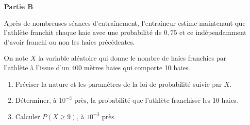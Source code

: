 \smallskip

\textbf{Partie B}

\medskip

Après de nombreuses séances d'entraînement, l’entraineur estime maintenant que l’athlète franchit chaque haie avec une probabilité de $0,75$ et ce indépendamment d’avoir franchi ou non les haies précédentes.

\smallskip

On note $X$ la variable aléatoire qui donne le nombre de haies franchies par l’athlète à l’issue d’un 400 mètres haies qui comporte 10 haies.

\begin{enumerate}
	\item Préciser la nature et les paramètres de la loi de probabilité suivie par $X$.
	\item Déterminer, à $10^{-3}$ près, la probabilité que l’athlète franchisse les 10 haies.
	\item Calculer $P(X \geqslant 9)$, à $10^{-3}$ près.
\end{enumerate}
